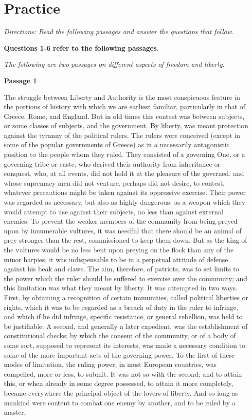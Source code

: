 \section{Practice}

\textit{Directions: Read the following passages and answer the questions that follow.}

\bigskip
\textbf{Questions 1-6 refer to the following passages.}

\bigskip
\textit{The following are two passages on different aspects of freedom and liberty.}

\bigskip
\textbf{Passage 1}
\begin{linenumbers}
\modulolinenumbers[5]
\indent The struggle between Liberty and Authority is the most conspicuous feature in the portions of history with which we are earliest familiar, particularly in that of Greece, Rome, and England. But in old times this contest was between subjects, or some classes of subjects, and the government. By liberty, was meant protection against the tyranny of the political rulers. The rulers were conceived (except in some of the popular governments of Greece) as in a necessarily antagonistic position to the people whom they ruled. They consisted of a governing One, or a governing tribe or caste, who derived their authority from inheritance or conquest, who, at all events, did not hold it at the pleasure of the governed, and whose supremacy men did not venture, perhaps did not desire, to contest, whatever precautions might be taken against its oppressive exercise. Their power was regarded as necessary, but also as highly dangerous; as a weapon which they would attempt to use against their subjects, no less than against external enemies. To prevent the weaker members of the community from being preyed upon by innumerable vultures, it was needful that there should be an animal of prey stronger than the rest, commissioned to keep them down. But as the king of the vultures would be no less bent upon preying on the flock than any of the minor harpies, it was indispensable to be in a perpetual attitude of defense against his beak and claws. The aim, therefore, of patriots, was to set limits to the power which the ruler should be suffered to exercise over the community; and this limitation was what they meant by liberty. It was attempted in two ways. First, by obtaining a recognition of certain immunities, called political liberties or rights, which it was to be regarded as a breach of duty in the ruler to infringe, and which if he did infringe, specific resistance, or general rebellion, was held to be justifiable. A second, and generally a later expedient, was the establishment of constitutional checks; by which the consent of the community, or of a body of some sort, supposed to represent its interests, was made a necessary condition to some of the more important acts of the governing power. To the first of these modes of limitation, the ruling power, in most European countries, was compelled, more or less, to submit. It was not so with the second; and to attain this, or when already in some degree possessed, to attain it more completely, became everywhere the principal object of the lovers of liberty. And so long as mankind were content to combat one enemy by another, and to be ruled by a master, 
\end{linenumbers}
